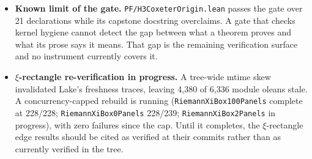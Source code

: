 \begin{itemize}
\item \textbf{Known limit of the gate.} \texttt{PF/H3CoxeterOrigin.lean}
passes the gate over 21 declarations while its capstone docstring
overclaims. A gate that checks kernel hygiene cannot detect the gap
between what a theorem proves and what its prose says it means. That gap
is the remaining verification surface and no instrument currently covers
it.

\item \textbf{$\xi$-rectangle re-verification in progress.} A tree-wide
mtime skew invalidated Lake's freshness traces, leaving 4{,}380 of
6{,}336 module oleans stale. A concurrency-capped rebuild is running
(\texttt{RiemannXiBox100Panels} complete at 228/228;
\texttt{RiemannXiBox0Panels} 228/239; \texttt{RiemannXiBox2Panels} in
progress), with zero failures since the cap. Until it completes, the
$\xi$-rectangle edge results should be cited as verified at their
commits rather than as currently verified in the tree.

\end{itemize}

